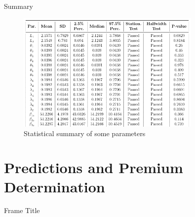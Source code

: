 \documentclass[10pt]{beamer} %
\begin{document}
\begin{frame}{Summary}
    \begin{figure}
        \centering
        \includegraphics[width=0.8\textwidth ]{summary1.png}
        \caption{Statistical summary of some parameters}
        \label{fig:summary}
    \end{figure}
\end{frame}

\section{Predictions and Premium Determination}
\begin{frame}{Frame Title}
    
\end{frame}
\end{document}
